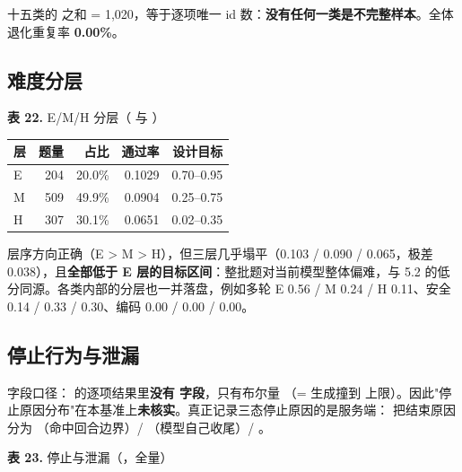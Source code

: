 \documentclass[11pt,openany]{ctexart}
\begin{document}
十五类的  之和 = 1,020，等于逐项唯一 id 数：\textbf{没有任何一类是不完整样本}。全体退化重复率 \textbf{0.00\allowbreak{}\%}。

\subsection{难度分层}

\noindent\textbf{表 22.} E/M/H 分层（ 与 ）

\begin{center}
\small
\begin{tabular}{lrrrr}
\toprule
\textbf{层} & \textbf{题量} & \textbf{占比} & \textbf{通过率} & \textbf{设计目标} \\
\midrule
E & 204 & 20.0\allowbreak{}\% & 0.1029 & 0.70–0.95 \\
M & 509 & 49.9\allowbreak{}\% & 0.0904 & 0.25–0.75 \\
H & 307 & 30.1\allowbreak{}\% & 0.0651 & 0.02–0.35 \\
\bottomrule
\end{tabular}
\end{center}

层序方向正确（E > M > H），但三层几乎塌平（0.103 / 0.090 / 0.065，极差 0.038），且\textbf{全部低于 E 层的目标区间}：整批题对当前模型整体偏难，与 5.2 的低分同源。各类内部的分层也一并落盘，例如多轮 E 0.56 / M 0.24 / H 0.11、安全 0.14 / 0.33 / 0.30、编码 0.00 / 0.00 / 0.00。

\subsection{停止行为与泄漏}

字段口径： 的逐项结果里\textbf{没有  字段}，只有布尔量 （= 生成撞到  上限）。因此"停止原因分布"在本基准上\textbf{未核实}。真正记录三态停止原因的是服务端： 把结束原因分为 （命中回合边界）/ （模型自己收尾）/ 。

\noindent\textbf{表 23.} 停止与泄漏（，全量）
\end{document}
